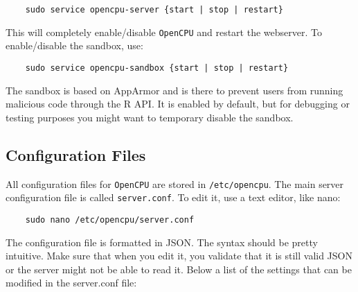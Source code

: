\documentclass{scrartcl}
\begin{document}
\begin{verbatim}
    sudo service opencpu-server {start | stop | restart}
\end{verbatim}

This will completely enable/disable \texttt{OpenCPU} and restart the webserver. To
enable/disable the sandbox, use:

\begin{verbatim}
    sudo service opencpu-sandbox {start | stop | restart}
\end{verbatim}
The sandbox is based on AppArmor and is there to prevent users from running
malicious code through the R API. It is enabled by default, but for debugging or
testing purposes you might want to temporary disable the sandbox.

\subsection{Configuration Files}

All configuration files for \texttt{OpenCPU} are stored in
\texttt{/etc/opencpu}. The main server configuration file is called
\texttt{server.conf}. To edit it, use a text editor, like nano:

\begin{verbatim}
    sudo nano /etc/opencpu/server.conf
\end{verbatim}
The configuration file is formatted in JSON. The syntax should be pretty
intuitive. Make sure that when you edit it, you validate that it is still
valid JSON or the server might not be able to read it. Below a list of the
settings that can be modified in the server.conf file:
\end{document}
